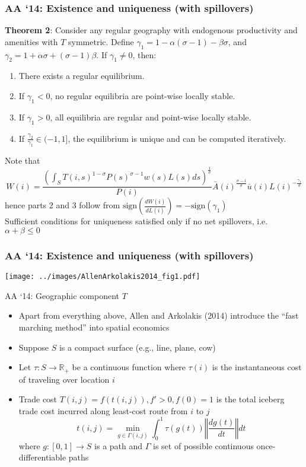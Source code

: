\documentclass[11pt,notes=hide,aspectratio=169]{beamer}
\begin{document}
\begin{frame}
\frametitle{AA `14: Existence and uniqueness (with spillovers)}
\textbf{Theorem 2}: Consider any regular geography with endogenous productivity and amenities with $T$ symmetric. Define $\gamma_{1} = 1-\alpha\left(\sigma-1\right)-\beta\sigma$, and $\gamma_{2} = 1+\alpha\sigma+\left(\sigma-1\right)\beta$. If $\gamma_{1}\neq0$, then:
\begin{enumerate}
\item There exists a regular equilibrium. 
\item If $\gamma_{1}<0$, no regular equilibria are point-wise locally stable.
\item If $\gamma_{1}>0$, all equilibria are regular and point-wise locally stable.\medskip
\item If $\frac{\gamma_{2}}{\gamma_{1}}\in(-1,1]$, the equilibrium is unique and can be computed iteratively. 
\end{enumerate}
Note that
\begin{equation*}
W(i) = \frac{\left( \int_{S} T(i,s)^{1-\sigma}P(s)^{\sigma-1} w(s) L(s) ds  \right)^{\frac{1}{\sigma}}}{P(i)} \bar{A}(i)^{\frac{\sigma-1}{\sigma}}\bar{u}(i)L(i)^{-\frac{\gamma_{1}}{\sigma}}
\end{equation*}
hence parts 2 and 3 follow from $\text{sign}\left(\frac{dW(i)}{dL(i)}\right)=-\text{sign}(\gamma_1)$
\\ 
Sufficient conditions for uniqueness satisfied only if no net spillovers, i.e. $\alpha + \beta \leq 0$
\end{frame}
\begin{frame}
\frametitle{AA `14: Existence and uniqueness (with spillovers)}
\begin{center}
\texttt{[image: ../images/AllenArkolakis2014\_fig1.pdf]}
\end{center}
\end{frame}
\begin{frame}{AA `14: Geographic component $T$}
\begin{itemize}
	\item Apart from everything above, Allen and Arkolakis (2014) introduce the ``fast marching method'' into spatial economics
	\item Suppose $S$ is a compact surface (e.g., line, plane, cow) 
	\item Let $\tau: S\to\mathbb{R}_{+}$ be a continuous function where $\tau(i)$ is the instantaneous cost of traveling over location $i$
	\item Trade cost $T(i,j) = f(t(i,j)), f'>0, f(0)=1$ is the total iceberg trade cost incurred along least-cost route from $i$ to $j$
	$$t(i,j) = \min_{g\in\Gamma(i,j)} \int_{0}^{1} \tau(g(t)) \left\Vert \frac{dg(t)}{dt} \right\Vert dt$$
	where $g:[0,1]\to S$ is a path and $\Gamma$ is set of possible continuous once-differentiable paths
\end{itemize}
\end{frame}
\end{document}

